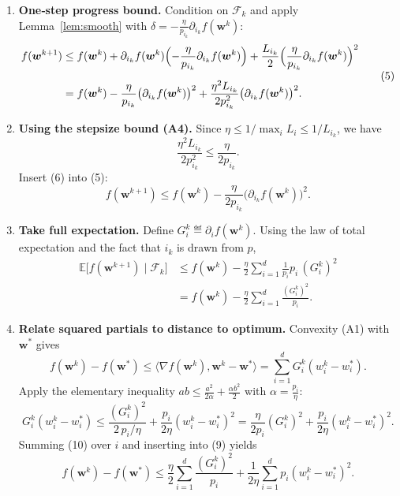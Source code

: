 \documentclass{article}
\newcommand{\E}{\mathbb{E}}
\newcommand{\ip}[2]{\langle #1,#2\rangle}
\begin{document}
\begin{enumerate}
\item[Step 1.] \textbf{One‑step progress bound.}  
Condition on $\mathcal{F}_k$ and apply Lemma~\ref{lem:smooth} with $\delta=-\frac{\eta}{p_{i_k}}\partial_{i_k}f(\bm w^{k})$:
\[
\begin{aligned}
f(\bm w^{k+1})
&\le f(\bm w^{k})+\partial_{i_k}f(\bm w^{k})\Bigl(-\frac{\eta}{p_{i_k}}\partial_{i_k}f(\bm w^{k})\Bigr)
   +\frac{L_{i_k}}{2}\Bigl(\frac{\eta}{p_{i_k}}\partial_{i_k}f(\bm w^{k})\Bigr)^{2}\\[2mm]
&= f(\bm w^{k})-\frac{\eta}{p_{i_k}}\bigl(\partial_{i_k}f(\bm w^{k})\bigr)^{2}
   +\frac{\eta^{2}L_{i_k}}{2p_{i_k}^{2}}\bigl(\partial_{i_k}f(\bm w^{k})\bigr)^{2}.
\end{aligned}
\tag{5}
\]
\item[Step 2.] \textbf{Using the stepsize bound (A4).}  
Since $\eta\le 1/\max_i L_i\le 1/L_{i_k}$, we have
\[
\frac{\eta^{2}L_{i_k}}{2p_{i_k}^{2}}\le \frac{\eta}{2p_{i_k}} .
\tag{6}
\]
Insert (6) into (5):
\[
f(\bm w^{k+1})\le f(\bm w^{k})-\frac{\eta}{2p_{i_k}}\bigl(\partial_{i_k}f(\bm w^{k})\bigr)^{2}.
\tag{7}
\]

\item[Step 3.] \textbf{Take full expectation.}  
Define $G_i^{k}\eqdef \partial_i f(\bm w^{k})$. Using the law of total expectation and the fact that $i_k$ is drawn from $p$,
\[
\begin{aligned}
\E\!\bigl[f(\bm w^{k+1})\mid\mathcal{F}_k\bigr]
&\le f(\bm w^{k})-\frac{\eta}{2}\sum_{i=1}^{d}\frac{1}{p_i}p_i\,(G_i^{k})^{2}\\
&= f(\bm w^{k})-\frac{\eta}{2}\sum_{i=1}^{d}\frac{(G_i^{k})^{2}}{p_i}.
\end{aligned}
\tag{8}
\]

\item[Step 4.] \textbf{Relate squared partials to distance to optimum.}  
Convexity (A1) with $\bm w^{*}$ gives
\[
f(\bm w^{k})-f(\bm w^{*})\le \ip{\nabla f(\bm w^{k})}{\bm w^{k}-\bm w^{*}}
   =\sum_{i=1}^{d}G_i^{k}(w^{k}_{i}-w^{*}_{i}).
\tag{9}
\]
Apply the elementary inequality $ab\le \frac{a^{2}}{2\alpha}+ \frac{\alpha b^{2}}{2}$ with $\alpha = \frac{p_i}{\eta}$:
\[
G_i^{k}(w^{k}_{i}-w^{*}_{i})
\le \frac{(G_i^{k})^{2}}{2\,p_i/\eta}
   +\frac{p_i}{2\eta}(w^{k}_{i}-w^{*}_{i})^{2}
= \frac{\eta}{2p_i}(G_i^{k})^{2}
   +\frac{p_i}{2\eta}(w^{k}_{i}-w^{*}_{i})^{2}.
\tag{10}
\]
Summing (10) over $i$ and inserting into (9) yields
\[
f(\bm w^{k})-f(\bm w^{*})
\le \frac{\eta}{2}\sum_{i=1}^{d}\frac{(G_i^{k})^{2}}{p_i}
   +\frac{1}{2\eta}\sum_{i=1}^{d}p_i (w^{k}_{i}-w^{*}_{i})^{2}.
\tag{11}
\]


\end{enumerate}
\end{document}
